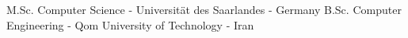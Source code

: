 %
%
%


\begin{scholarship}
					{M.Sc. Computer Science - Universität des Saarlandes - Germany}
					{B.Sc. Computer Engineering - Qom University of Technology - Iran}
\end{scholarship}
